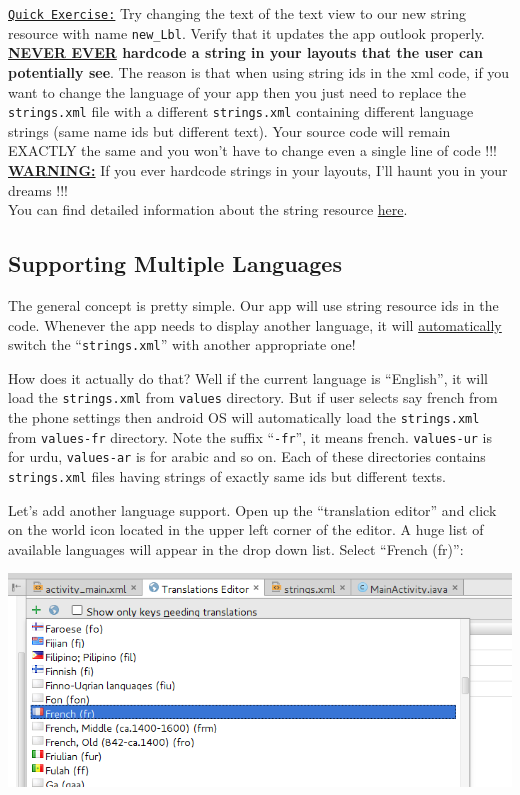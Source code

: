 \texttt{\underline{Quick Exercise:}} Try changing the text of the text view to our new string resource with name \texttt{new\_Lbl}. Verify that it updates the app outlook properly. \\

\textbf{\underline{NEVER EVER} hardcode a string in your layouts that the user can potentially see}. The reason is that when using string ids in the xml code, if you want to change the language of your app then you just need to replace the \texttt{strings.xml} file with a different \texttt{strings.xml} containing different language strings (same name ids but different text). Your source code will remain EXACTLY the same and you won't have to change even a single line of code !!! \\

\textbf{\underline{WARNING:}} If you ever hardcode strings in your layouts, I'll haunt you in your dreams !!! \\

You can find detailed information about the string resource \href{https://developer.android.com/guide/topics/resources/string-resource.html}{here}.

\subsection{Supporting Multiple Languages}
The general concept is pretty simple. Our app will use string resource ids in the code. Whenever the app needs to display another language, it will \underline{automatically} switch the ``\texttt{strings.xml}'' with another appropriate one!

How does it actually do that? Well if the current language is ``English'', it will load the \texttt{strings.xml} from \texttt{values} directory. But if user selects say french from the phone settings then android OS will automatically load the \texttt{strings.xml} from \texttt{values-fr} directory. Note the suffix ``\texttt{-fr}'', it means french. \texttt{values-ur} is for urdu, \texttt{values-ar} is for arabic and so on. Each of these directories contains \texttt{strings.xml} files having strings of exactly same ids but different texts.

Let's add another language support. Open up the ``translation editor'' and click on the world icon located in the upper left corner of the editor. A huge list of available languages will appear in the drop down list. Select ``French (fr)'':

\begin{center}
	\includegraphics[scale=0.4]{chapters/ch04/images/16}
\end{center}

